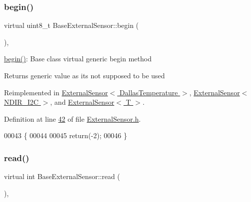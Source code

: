 \subsubsection{\texorpdfstring{begin()}{begin()}}
{\footnotesize\ttfamily virtual uint8\+\_\+t Base\+External\+Sensor\+::begin (\begin{DoxyParamCaption}{ }\end{DoxyParamCaption})\hspace{0.3cm}{\ttfamily [inline]}, {\ttfamily [virtual]}}

\hyperlink{class_base_external_sensor_a87d132803d4f4fdd4e66332809f0c9a0}{begin()}\+: Base class virtual generic begin method

\begin{DoxyReturn}{Returns}
generic value as it\textquotesingle{}s not supposed to be used 
\end{DoxyReturn}


Reimplemented in \hyperlink{class_external_sensor_3_01_dallas_temperature_01_4_ac5275129b05e2ff8df45d5b222a661d9}{External\+Sensor$<$ Dallas\+Temperature $>$}, \hyperlink{class_external_sensor_3_01_n_d_i_r___i2_c_01_4_ac6f3614d94968ef0cc11b2b4d69cef03}{External\+Sensor$<$ N\+D\+I\+R\+\_\+\+I2\+C $>$}, and \hyperlink{class_external_sensor_ab6fe1379d55b656a048e0fba1e0a32e6}{External\+Sensor$<$ T $>$}.



Definition at line \hyperlink{_external_sensor_8h_source_l00042}{42} of file \hyperlink{_external_sensor_8h_source}{External\+Sensor.\+h}.


\begin{DoxyCode}
00043     \{
00044 
00045         \textcolor{keywordflow}{return}(-2);
00046     \}
\end{DoxyCode}
\mbox{\label{class_base_external_sensor_a7e0a98f350148d7645031315657aa5ec}} 
\subsubsection{\texorpdfstring{read()}{read()}}
{\footnotesize\ttfamily virtual int Base\+External\+Sensor\+::read (\begin{DoxyParamCaption}{ }\end{DoxyParamCaption})\hspace{0.3cm}{\ttfamily [inline]}, {\ttfamily [virtual]}}

